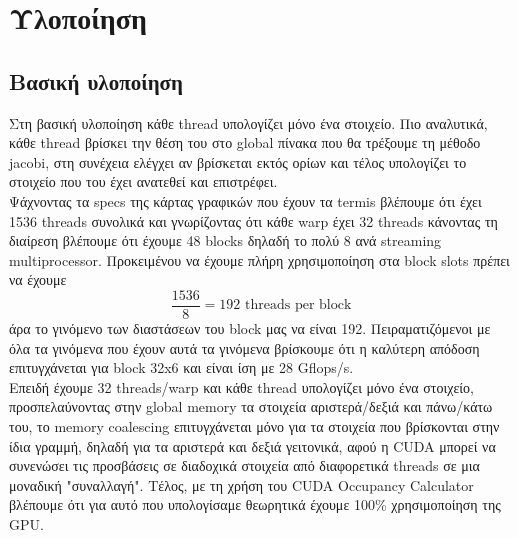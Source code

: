 \documentclass[11pt,a4paper]{article}
\begin{document}
\section{Υλοποίηση}
\subsection{Βασική υλοποίηση}
Στη βασική υλοποίηση κάθε thread υπολογίζει μόνο ένα στοιχείο. Πιο αναλυτικά, κάθε thread βρίσκει την θέση του στο global πίνακα που θα τρέξουμε τη μέθοδο jacobi, στη συνέχεια ελέγχει αν βρίσκεται εκτός ορίων και τέλος υπολογίζει το στοιχείο που του έχει ανατεθεί και επιστρέφει.\\  Ψάχνοντας τα specs της κάρτας γραφικών που έχουν τα termis βλέπουμε ότι έχει 1536 threads συνολικά και γνωρίζοντας ότι κάθε warp έχει 32 threads κάνοντας τη διαίρεση βλέπουμε ότι έχουμε 48 blocks δηλαδή το πολύ 8 ανά streaming multiprocessor. Προκειμένου να έχουμε πλήρη χρησιμοποίηση στα block slots πρέπει να έχουμε 
\[ \frac{1536}{8} = 192 \text{ threads per block} \] άρα το γινόμενο των διαστάσεων του block μας να είναι 192. Πειραματιζόμενοι με όλα τα γινόμενα που έχουν αυτά τα γινόμενα βρίσκουμε ότι η καλύτερη απόδοση επιτυγχάνεται για block 32x6 και είναι ίση με 28 Gflops/s. \\ Επειδή έχουμε 32 threads/warp και κάθε thread υπολογίζει μόνο ένα στοιχείο, προσπελαύνοντας στην global memory τα στοιχεία αριστερά/δεξιά και πάνω/κάτω του, το memory coalescing  επιτυγχάνεται μόνο για τα στοιχεία που βρίσκονται στην ίδια γραμμή, δηλαδή για τα αριστερά και δεξιά γειτονικά, αφού η CUDA μπορεί να συνενώσει τις προσβάσεις σε διαδοχικά στοιχεία από διαφορετικά threads σε μια μοναδική "συναλλαγή". Τέλος, με τη χρήση του CUDA Occupancy Calculator βλέπουμε ότι για αυτό που υπολογίσαμε θεωρητικά έχουμε 100\% χρησιμοποίηση της GPU.
\end{document}
